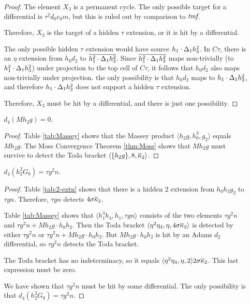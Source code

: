 \begin{proof}
The element $X_3$ is a permanent cycle.  The only possible target for 
a differential is $\tau^2 d_0 e_0 m$, but this is ruled out by 
comparison to $\textit{tmf}$.

Therefore, $X_3$ is the target of a hidden
$\tau$ extension, or it is hit by a differential.

The only possible hidden $\tau$ extension would have source
$h_1 \cdot \Delta_1 h_3^2$.  In $C\tau$, there is an $\eta$ extension from
$h_0 d_2$ to $\overline{h_1^2 \cdot \Delta_1 h_3^2}$.  
Since $\overline{h_1^2 \cdot \Delta_1 h_3^2}$ maps non-trivially 
(to $h_1^2 \cdot \Delta_1 h_3^2$) under projection to the top cell of
$C\tau$, it follows that
$h_0 d_2$ also maps non-trivially under projection.
the only possibility is that $h_0 d_2$ maps to
$h_1 \cdot \Delta_1 h_3^2$, and therefore
$h_1 \cdot \Delta_1 h_3^2$ does not support a hidden 
$\tau$ extension.

Therefore, $X_3$ must be hit by a differential, and there is just
one possibility.
\end{proof}

\begin{lemma}
\label{lem:d4-Mh2g}
$d_4(M h_2 g) = 0$.
\end{lemma}

\begin{proof}
Table \ref{tab:Massey} shows that the Massey product
$\langle h_2 g, h_0^3, g_2 \rangle$ equals $M h_2 g$.
The Moss Convergence Theorem \ref{thm:Moss} shows that
$M h_2 g$ must survive to detect the Toda bracket
$\langle \{h_2 g\}, 8, \overline{\kappa}_2 \rangle$.
\end{proof}

\begin{lemma}
\label{lem:d4-h2^2G0}
$d_4(h_2^2 G_0) = \tau g^2 n$.
\end{lemma}

\begin{proof}
Table \ref{tab:2-extn} shows that
there is a hidden $2$ extension from 
$h_0 h_3 g_2$ to $\tau g n$.  Therefore, 
$\tau g n$ detects $4 \sigma \overline{\kappa}_2$.

Table \ref{tab:Massey} shows that
$\langle h_1^3 h_4, h_1, \tau g n \rangle$ consists of the
two elements
$\tau g^2 n$ and $\tau g^2 n + M h_2 g \cdot h_0 h_2$.
Then the Toda bracket
$\langle \eta^2 \eta_4, \eta, 4 \sigma \overline{\kappa}_2 \rangle$
is detected by either
$\tau g^2 n$ or $\tau g^2 n + M h_2 g \cdot h_0 h_2$.
But $M h_2 g \cdot h_0 h_2$ is hit by an Adams $d_2$ differential,
so $\tau g^2 n$ detects the Toda bracket.

The Toda bracket has no indeterminacy, so it equals
$\langle \eta^2 \eta_4, \eta, 2 \rangle 2 \sigma \overline{\kappa}_2$.
This last expression must be zero.

We have shown that $\tau g^2 n$ must be hit by some differential.
The only possibility is that $d_4(h_2^2 G_0) = \tau g^2 n$.
\end{proof}

